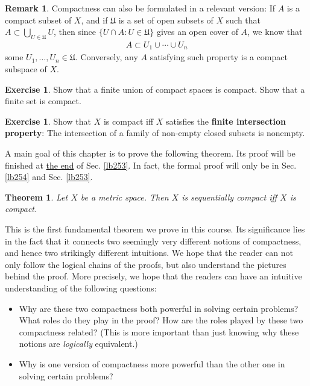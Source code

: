 \documentclass[12pt,b5paper,notitlepage]{article}
\theoremstyle{definition}
\newtheorem{exe}[df]{Exercise}
\newtheorem{rem}[df]{Remark}
\theoremstyle{plain}
\newtheorem{thm}[df]{Theorem}
\newcommand{\fk}{\mathfrak}
\numberwithin{equation}{section}
\begin{document}
\begin{rem}\label{lb244}
Compactness can also be formulated in a relevant version: If $A$ is a compact subset of $X$, and if $\fk U$ is a set of open subsets of $X$ such that $A\subset\bigcup_{U\in\fk U}U$, then since $\{U\cap A:U\in\fk U\}$ gives an open cover of $A$, we know that
\begin{align*}
A\subset U_1\cup\cdots\cup U_n
\end{align*}
some $U_1,\dots,U_n\in\fk U$. Conversely, any $A$ satisfying such property is a compact subspace of $X$.
\end{rem}


\begin{exe}
Show that a finite union of compact spaces is compact. Show that a finite set is compact.
\end{exe}

\begin{exe}
Show that $X$ is compact iff $X$ satisfies the \textbf{finite intersection property}:  The intersection of a family of non-empty closed subsets is nonempty.
\end{exe}



A main goal of this chapter is to prove the following theorem. Its proof will be finished at \hyperlink{target1}{the end} of Sec. \ref{lb253}. In fact, the formal proof will only be in Sec. \ref{lb254} and Sec. \ref{lb253}. 

\begin{thm}\label{lb222}
Let $X$ be a metric space. Then $X$ is sequentially compact iff $X$ is compact.
\end{thm}
This is the first fundamental theorem we prove in this course. Its significance lies in the fact that it connects two seemingly very different notions of compactness, and hence two strikingly different intuitions. We hope that the reader can not only follow the logical chains of the proofs, but also understand the pictures behind the proof. More precisely, we hope that the readers can have an intuitive understanding of the following questions:
\begin{itemize}
\item Why are these two compactness both powerful in solving certain problems? What roles do they play in the proof? How are the roles played by these two compactness related? (This is more important than just knowing why these notions are \textit{logically} equivalent.)
\item Why is one version of compactness more powerful than the other one in solving certain problems?
\end{itemize}
\end{document}
